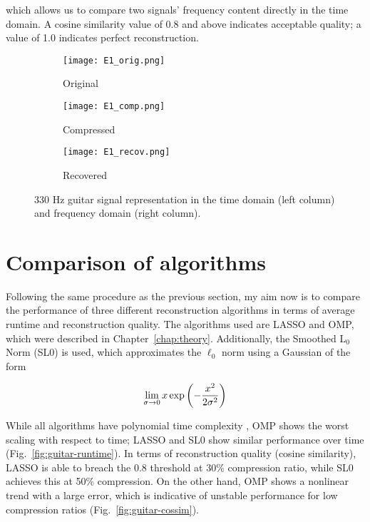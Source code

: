 \noindent which allows us to compare two signals' frequency content directly in the time domain. A cosine similarity value of 0.8 and above indicates acceptable quality; a value of 1.0 indicates perfect reconstruction.

\begin{figure}[htb]
	\centering
	\begin{subfigure}{\textwidth}
		\centering
		\texttt{[image: E1\_orig.png]}
		\caption{Original}
		\label{fig:guitar-original}
	\end{subfigure}
	\begin{subfigure}{\textwidth}
		\centering
		\texttt{[image: E1\_comp.png]}
		\caption{Compressed}
		\label{fig:guitar-compressed}
	\end{subfigure}
	\begin{subfigure}{\textwidth}
		\centering
		\texttt{[image: E1\_recov.png]}
		\caption{Recovered}
		\label{fig:guitar-recovered}
	\end{subfigure}
	\caption{330 Hz guitar signal representation in the time domain (left column) and frequency domain (right column).}
	\label{fig:guitar}
\end{figure}


\section{Comparison of algorithms}
\label{sec:audio-algorithms}
Following the same procedure as the previous section, my aim now is to compare the performance of three different reconstruction algorithms in terms of average runtime and reconstruction quality. The algorithms used are LASSO and OMP, which were described in Chapter~\ref{chap:theory}. Additionally, the Smoothed L$_0$ Norm (SL0) \cite{Mohimani2009} is used, which approximates the $\ell_0$ norm using a Gaussian of the form

\begin{equation}
	\label{eq:sl0}
	\lim_{\sigma \rightarrow 0} x \exp\qty(-\frac{x^2}{2\sigma^2})
\end{equation}

While all algorithms have polynomial time complexity \cite{Efron2004,Sturm2012,Xiang2019}, OMP shows the worst scaling with respect to time; LASSO and SL0 show similar performance over time (Fig.~\ref{fig:guitar-runtime}). In terms of reconstruction quality (cosine similarity), LASSO is able to breach the 0.8 threshold at 30\% compression ratio, while SL0 achieves this at 50\% compression. On the other hand, OMP shows a nonlinear trend with a large error, which is indicative of unstable performance for low compression ratios (Fig.~\ref{fig:guitar-cossim}).

